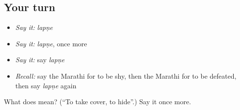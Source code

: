 \subsection*{Your turn}
\begin{itemize}
\raggedright
  \item \emph{Say it:} \emph{lapṇe}
  \item \emph{Say it:} \emph{lapṇe}, once more
  \item \emph{Say it:} say \emph{lapṇe}
  \item \emph{Recall:} say the Marathi for to be shy, then the Marathi for to be defeated, then say \emph{lapṇe} again
\end{itemize}

\begin{tcolorbox}[breakable,colback=teal!4,colframe=teal!35!black,title={Before you move on}]
What does  mean? (\textquotedblleft{}To take cover, to hide\textquotedblright{}.) Say it once more.
\end{tcolorbox}
